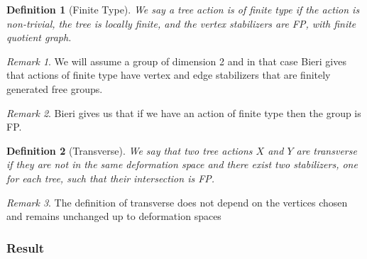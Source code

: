 \documentclass{article}
\theoremstyle{mystyle}
\newtheorem{defn}{Definition}[section]
\theoremstyle{remark}
\newtheorem{rmk}{Remark}[section]
\begin{document}
\begin{defn}[Finite Type]
    \label{defn:finitetype} 
We say a tree action is of \emph{finite type} if the action is non-trivial, the tree is locally finite, and the vertex stabilizers are FP, with finite quotient graph.
\end{defn}

\begin{rmk}
    We will assume a group of dimension 2 and in that case Bieri gives that actions of finite type have vertex and edge stabilizers that are finitely generated free groups.
\end{rmk}

\begin{rmk}
    Bieri gives us that if we have an action of finite type then the group is FP.
\end{rmk}

\begin{defn}[Transverse]
    \label{defn:transverse} 
    We say that two tree actions $X$ and $Y$ are \emph{transverse} if they are not in the same deformation space and there exist two stabilizers, one for each tree, such that their intersection is FP.
\end{defn}

\begin{rmk}
    The definition of transverse does not depend on the vertices chosen and remains unchanged up to deformation spaces
\end{rmk}

\subsubsection{Result}
\end{document}

